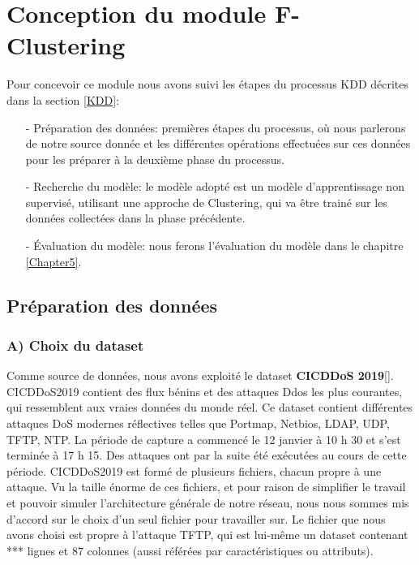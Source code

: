 \newpage
\section{Conception du module F-Clustering}
\label{F-Clustering}
Pour concevoir ce module nous avons suivi les étapes du processus KDD décrites dans la section \ref{KDD}:\\
\begin{itemize}
\item[-] Préparation des données: premières étapes du processus, où nous parlerons de notre source donnée et les différentes opérations effectuées sur ces données pour les préparer à la deuxième phase du processus. \\
\item[-] Recherche du modèle: le modèle adopté est un modèle d'apprentissage non supervisé, utilisant une approche de Clustering, qui va être trainé sur les données collectées dans la phase précédente.\\
\item[-] Évaluation du modèle: nous ferons l'évaluation du modèle dans le chapitre \ref{Chapter5}.
\end{itemize}

\subsection{Préparation des données}
\subsubsection{A) Choix du dataset }
Comme source de données, nous avons exploité le dataset \textbf{ CICDDoS 2019}[\cite{21}]. CICDDoS2019 contient des flux bénins et des attaques Ddos les plus courantes, qui ressemblent aux vraies données du monde réel. Ce dataset contient différentes attaques DoS modernes réflectives telles que Portmap, Netbios, LDAP, UDP, TFTP, NTP. La période de capture a commencé le 12 janvier à 10 h 30 et s’est terminée à 17 h 15. Des attaques ont par la suite été exécutées au cours de cette période.
\newpage
CICDDoS2019 est formé de plusieurs fichiers, chacun propre à une attaque. Vu la taille énorme de ces fichiers, et pour raison de simplifier le travail et pouvoir simuler l'architecture générale de notre réseau, nous nous sommes mis d’accord sur le choix d'un seul fichier pour travailler sur. Le fichier que nous avons choisi est propre à l'attaque TFTP, qui est lui-même un dataset contenant *** lignes et 87 colonnes (aussi référées par caractéristiques ou attributs).

